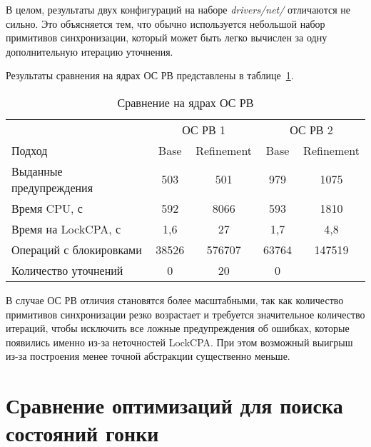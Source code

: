 В целом, результаты двух конфигураций на наборе \textit{drivers/net/} отличаются не сильно.
Это объясняется тем, что обычно используется небольшой набор примитивов синхронизации, который может быть легко вычислен за одну дополнительную итерацию уточнения.

Результаты сравнения на ядрах ОС РВ представлены в таблице~\ref{table-os-lock-refinement}.

  \begin{table}[h]\footnotesize \centering
    \caption{Сравнение на ядрах ОС РВ}
  	\label{table-os-lock-refinement}
    \begin{tabular}{ | l | c | c | c | c | }
      \hline
      		& 			 \multicolumn{2}{|c|}{ОС РВ 1} & 		\multicolumn{2}{|c|}{ОС РВ 2}\\
      Подход         					& Base  & Refinement  	& Base  & Refinement 	\\ \hline
      Выданные предупреждения			& 503   & 501    		& 979   & 1075  		\\ 
  	  Время CPU, с 						& 592   & 8066 			& 593   & 1810  		\\ 
  \hspace{0.5cm} Время на LockCPA, с	& 1,6   & 27    		& 1,7   & 4,8  			\\ \hline
      Операций с блокировками  			& 38526	& 576707   		& 63764 & 147519  		\\ 
      Количество уточнений  			& 0   	& 20   			& 0   	& \todo{2}  	\\ 
      \hline
    \end{tabular}
  \end{table}


В случае ОС РВ отличия становятся более масштабными, так как количество примитивов синхронизации резко возрастает и требуется значительное количество итераций, чтобы исключить все ложные предупреждения об ошибках, которые появились именно из-за неточностей LockCPA.
При этом возможный выигрыш из-за построения менее точной абстракции существенно меньше. 



\section{Сравнение оптимизаций для поиска состояний гонки}

